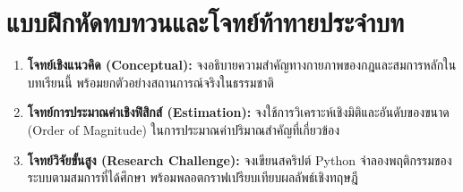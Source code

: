 \section{แบบฝึกหัดทบทวนและโจทย์ท้าทายประจำบท}

\begin{enumerate}[leftmargin=1.5cm, label={\textbf{\thechapter.\arabic*}}, itemsep=8pt]
    \item \textbf{โจทย์เชิงแนวคิด (Conceptual):} จงอธิบายความสำคัญทางกายภาพของกฎและสมการหลักในบทเรียนนี้ พร้อมยกตัวอย่างสถานการณ์จริงในธรรมชาติ
    \item \textbf{โจทย์การประมาณค่าเชิงฟิสิกส์ (Estimation):} จงใช้การวิเคราะห์เชิงมิติและอันดับของขนาด (Order of Magnitude) ในการประมาณค่าปริมาณสำคัญที่เกี่ยวข้อง
    \item \textbf{โจทย์วิจัยขั้นสูง (Research Challenge):} จงเขียนสคริปต์ Python จำลองพฤติกรรมของระบบตามสมการที่ได้ศึกษา พร้อมพลอตกราฟเปรียบเทียบผลลัพธ์เชิงทฤษฎี
\end{enumerate}

